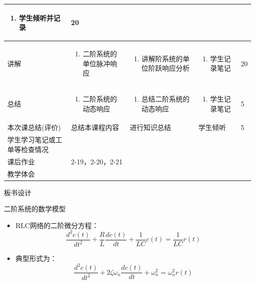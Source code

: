 {\begin{landscape}
\begin{longtable}{|m{10mm}|m{50mm}|m{50mm}|m{50mm}|m{15mm}|}
\begin{enumerate}
\item 学生倾听并记录
\end{enumerate} &20 \\\hline
讲解&\begin{enumerate}
\item 二阶系统的单位脉冲响应
\end{enumerate}
 &\begin{enumerate}
\item 讲解阶系统的单位阶跃响应分析
\end{enumerate} &\begin{enumerate}
\item 学生记录笔记
\end{enumerate} &20 \\\hline
总结&
\begin{enumerate}
\item 二阶系统的动态响应
\end{enumerate}
 &\begin{enumerate}
\item 总结二阶系统的动态响应
\end{enumerate} &\begin{enumerate}
\item 学生记录笔记
\end{enumerate} &5 \\\hline
\centering 本次课总结(评价)&总结本课程内容 &进行知识总结 &学生倾听 &5 \\\hline
\centering 学生学习笔记或工单等检查情况&\multicolumn{4}{m{165mm}|}{\quad}\\\hline
\centering 课后作业&\multicolumn{4}{m{165mm}|}{2-19，2-20，2-21}\\\hline
\centering 教学体会&\multicolumn{4}{m{165mm}|}{\quad}\\
\end{longtable}

\end{landscape}
\clearpage
\begin{center}
{\huge 板书设计}
\end{center}
}
 \begin{frame}{二阶系统的数学模型}
 \begin{block}{}
 \begin{itemize}
 \item<+-> RLC网络的二阶微分方程：
 \[\frac{d^2c(t)}{dt^2}+\frac{R}{L}\frac{dc(t)}{dt}+\frac{1}{LC}c(t)=\frac{1}{LC}r(t)\]
 \item<+-> 典型形式为：
 \[\frac{d^2c(t)}{dt^2}+2\zeta\omega_n\frac{dc(t)}{dt}+\omega_n^2=\omega_n^2r(t)\]
 \end{itemize}
 \end{block}
 \end{frame}
 
